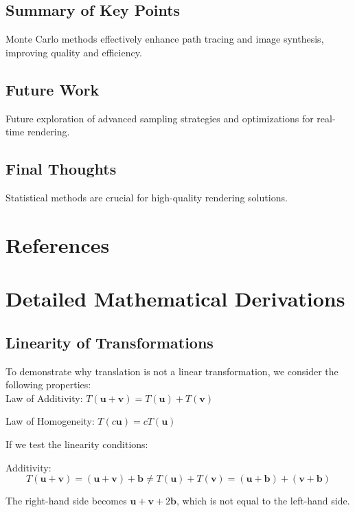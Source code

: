 \documentclass[12pt]{article}
\begin{document}
\subsection{Summary of Key Points}
Monte Carlo methods effectively enhance path tracing and image synthesis, improving quality and efficiency.

\subsection{Future Work}
Future exploration of advanced sampling strategies and optimizations for real-time rendering.

\subsection{Final Thoughts}
Statistical methods are crucial for high-quality rendering solutions.

\section{References}
\label{sec:references}



\appendix
\section{Detailed Mathematical Derivations}
\label{sec:appendix-derivations}

\subsection{Linearity of Transformations}
\label{sec:appendix-derivations-linear}
To demonstrate why translation is not a linear transformation, we consider the following properties: \\

Law of Additivity: \( T(\mathbf{u} + \mathbf{v}) = T(\mathbf{u}) + T(\mathbf{v}) \)

Law of Homogeneity: \( T(c\mathbf{u}) = cT(\mathbf{u}) \)

If we test the linearity conditions:

Additivity:
\[
    T(\mathbf{u} + \mathbf{v}) = (\mathbf{u} + \mathbf{v}) + \mathbf{b} \neq T(\mathbf{u}) + T(\mathbf{v}) = (\mathbf{u} + \mathbf{b}) + (\mathbf{v} + \mathbf{b})
\]

The right-hand side becomes \( \mathbf{u} + \mathbf{v} + 2\mathbf{b} \), which is not equal to the left-hand side.
\end{document}

